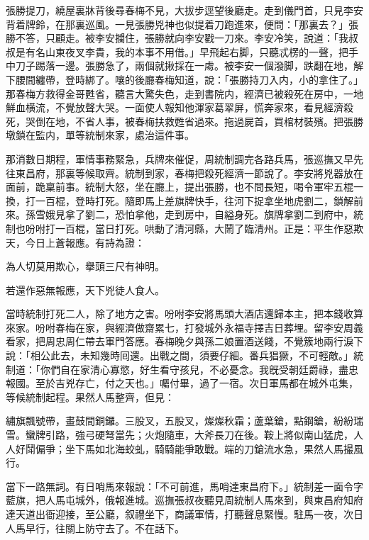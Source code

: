 張勝提刀，繞屋裏牀背後尋春梅不見，大拔步逕望後廳走。走到儀門首，只見李安背着牌鈴，在那裏巡風。一見張勝兇神也似提着刀跑進來，便問：「那裏去？」張勝不答，只顧走。被李安攔住，張勝就向李安戳一刀來。李安冷笑，說道：「我叔叔是有名山東夜叉李貴，我的本事不用借。」早飛起右脚，只聽忒楞的一聲，把手中刀子踢落一邊。張勝急了，兩個就揪採在一䖏。被李安一個潑脚，跌翻在地，解下腰間纏帶，登時綁了。嚷的後廳春梅知道，說：「張勝持刀入内，小的拿住了。」那春梅方救得金哥甦省，聽言大驚失色，走到書院内，經濟已被殺死在房中，一地鮮血横流，不覺放聲大哭。一面使人報知他渾家葛翠屏，慌奔家來，看見經濟殺死，哭倒在地，不省人事，被春梅扶救甦省過來。拖過屍首，買棺材裝殯。把張勝墩鎖在監内，單等統制來家，處治這件事。

那消數日期程，軍情事務緊急，兵牌來催促，周統制調完各路兵馬，張巡撫又早先往東昌府，那裏等候取齊。統制到家，春梅把殺死經濟一節說了。李安將兇器放在面前，跪稟前事。統制大怒，坐在廳上，提出張勝，也不問長短，喝令軍牢五棍一換，打一百棍，登時打死。隨即馬上差旗牌快手，往河下捉拿坐地虎劉二，鎖解前來。孫雪娥見拿了劉二，恐怕拿他，走到房中，自縊身死。旗牌拿劉二到府中，統制也吩咐打一百棍，當日打死。哄動了清河縣，大鬧了臨清州。正是：平生作惡欺天，今日上蒼報應。有詩為證：

為人切莫用欺心，擧頭三尺有神明。

若還作惡無報應，天下兇徒人食人。

當時統制打死二人，除了地方之害。吩咐李安將馬頭大酒店還歸本主，把本錢收算來家。吩咐春梅在家，與經濟做齋累七，打發城外永福寺擇吉日葬埋。留李安周義看家，把周忠周仁帶去軍門答應。春梅晚夕與孫二娘置酒送餞，不覺簇地兩行淚下說：「相公此去，未知幾時囘還。出戰之間，須要仔細。番兵猖獗，不可輕敵。」統制道：「你們自在家清心寡慾，好生看守孩兒，不必憂念。我旣受朝廷爵祿，盡忠報國。至於吉兇存亡，付之天也。」囑付畢，過了一宿。次日軍馬都在城外屯集，等候統制起程。果然人馬整齊，但見：

繡旗飄號帶，畫鼓間銅鑼。三股叉，五股叉，燦燦秋霜；蘆葉鎗，點鋼鎗，紛紛瑞雪。蠻牌引路，強弓硬弩當先；火炮隨車，大斧長刀在後。鞍上將似南山猛虎，人人好鬦偏爭；坐下馬如北海蛟虬，騎騎能爭敢戰。端的刀鎗流水急，果然人馬撮風行。

當下一路無詞。有日哨馬來報說：「不可前進，馬哨達東昌府下。」統制差一面令字藍旗，把人馬屯城外，俄報進城。巡撫張叔夜聽見周統制人馬來到，與東昌府知府達天道出衙迎接，至公廳，叙禮坐下，商議軍情，打聽聲息緊慢。駐馬一夜，次日人馬早行，往關上防守去了。不在話下。


